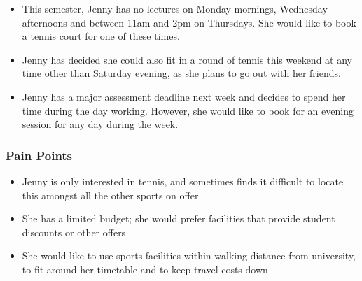 \begin{itemize}
	\item This semester, Jenny has no lectures on Monday mornings,
		Wednesday afternoons and between 11am and 2pm on Thursdays.
		She would like to book a tennis court for one of these times.

	\item Jenny has decided she could also fit in a round of tennis
		this weekend at any time other than Saturday evening, as she
		plans to go out with her friends.

	\item Jenny has a major assessment deadline next week and decides
		to spend her time during the day working. However, she would
		like to book for an evening session for any day during the
		week.
\end{itemize}


\subsubsection*{Pain Points}
\label{ssub:student_pain_points}

\begin{itemize}
	\item Jenny is only interested in tennis, and sometimes finds it
		difficult to locate this amongst all the other sports on offer

	\item She has a limited budget; she would prefer facilities that
		provide student discounts or other offers

	\item She would like to use sports facilities within walking
		distance from university, to fit around her timetable and to
		keep travel costs down
\end{itemize}

